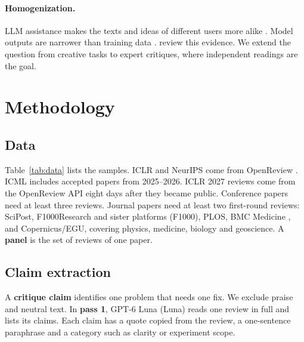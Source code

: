\documentclass[11pt]{article}
\begin{document}
\paragraph{Homogenization.} LLM assistance makes the texts and ideas of different users more alike \citep{padmakumar2024writing,anderson2024homogenization,doshi2024generative}. Model outputs are narrower than training data \citep{wu2025monoculture}. \citet{sourati2026homogenizing} review this evidence. We extend the question from creative tasks to expert critiques, where independent readings are the goal.

\section{Methodology}
\label{sec:data}

\subsection{Data}
Table~\ref{tab:data} lists the samples. ICLR and NeurIPS come from OpenReview \citep{arcade2025dataset,xu2025researcharcade,heineman2026iclr}. ICML includes accepted papers from 2025--2026. ICLR 2027 reviews come from the OpenReview API eight days after they became public. Conference papers need at least three reviews. Journal papers need at least two first-round reviews: SciPost, F1000Research and sister platforms (F1000), PLOS, BMC Medicine \citep{jerma2026bmc}, and Copernicus/EGU, covering physics, medicine, biology and geoscience. A \textbf{panel} is the set of reviews of one paper.

\begin{table}[t]
\centering\footnotesize

\caption{Papers and reviews in the analysis.}
\label{tab:data}
\end{table}

\subsection{Claim extraction}
\label{sec:extraction}
A \textbf{critique claim} identifies one problem that needs one fix. We exclude praise and neutral text. In \textbf{pass 1}, GPT-6 Luna (Luna) reads one review in full and lists its claims. Each claim has a quote copied from the review, a one-sentence paraphrase and a category such as clarity or experiment scope.
\end{document}
